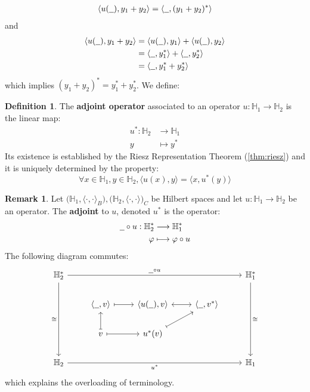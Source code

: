 \documentclass[12pt]{article}
\theoremstyle{plain}
\theoremstyle{definition}
\newtheorem{defn}[thm]{Definition} %
\newtheorem{remark}[thm]{Remark}
\newcommand{\bb}[1]{\mathbb{#1}}
\newcommand{\und}[1]{\underline{\hspace{#1 cm}}}
\newcommand{\lto}{\longrightarrow}
\begin{document}
\begin{align*}
    \langle u(\und{0.2}), y_1 + y_2\rangle &= \langle \und{0.2}, (y_1 + y_2)^\ast\rangle\\
\end{align*}
and
\begin{align*}
    \langle u(\und{0.2}), y_1 + y_2\rangle &= \langle u(\und{0.2}), y_1\rangle + \langle u(\und{0.2}), y_2\rangle\\
    &= \langle \und{0.2}, y_1^\ast\rangle + \langle \und{0.2}, y_2^\ast\rangle\\
    &= \langle \und{0.2}, y_1^\ast + y_2^\ast\rangle
\end{align*}
which implies $(y_1 + y_2)^\ast = y_1^\ast + y_2^\ast$. We define:
\begin{defn}
The \textbf{adjoint operator} associated to an operator $u: \bb{H}_1 \lto \bb{H}_2$ is the linear map:
\begin{align*}
    u^\ast: \bb{H}_2 &\lto \bb{H}_1\\
    y &\longmapsto y^\ast
\end{align*}
Its existence is established by the Riesz Representation Theorem (\ref{thm:riesz}) and it is uniquely determined by the property:
\begin{equation}
    \forall x\in\bb{H}_1,y\in\bb{H}_2, \langle u(x),y\rangle = \langle x, u^\ast(y)\rangle
\end{equation}
\end{defn}
\begin{remark}
Let $\big(\bb{H}_1,\langle\cdot,\cdot\rangle_B\big), \big(\bb{H}_2,\langle \cdot, \cdot \rangle\big)_C$ be Hilbert spaces and let $u: \bb{H}_1 \lto \bb{H}_2$ be an operator. The \textbf{adjoint} to $u$, denoted $u^\ast$ is the operator:
\begin{align}
    \und{0.2} \circ u: \bb{H}_2^\ast &\lto \bb{H}_1^\ast\\
    \varphi &\longmapsto \varphi \circ u
\end{align}
The following diagram commutes:
\begin{equation}
\begin{tikzcd}
\bb{H}_{2}^{\ast}\arrow[rrrr,"{\und{0.2} \circ u}"]\arrow[ddd,swap,"{\cong}"] & & & & \bb{H}_1^{\ast}\arrow[ddd,"{\cong}"]\\
&\langle\und{0.2},v\rangle\arrow[r,mapsto] & \langle u(\und{0.2}), v\rangle\arrow[r,leftrightarrow] & \langle \und{0.2},v^{\ast}\rangle\\
&v\arrow[r,mapsto]\arrow[u,mapsto] & u^{\ast}(v)\arrow[ur,mapsto]\\
\bb{H}_2\arrow[rrrr,swap,"{u^\ast}"] & & & & \bb{H}_1
\end{tikzcd}
\end{equation}
which explains the overloading of terminology.
\end{remark}
\end{document}

